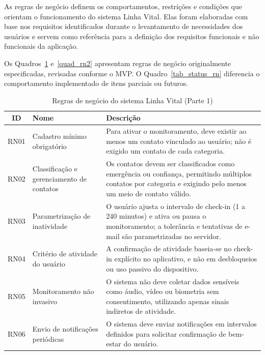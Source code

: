 As regras de negócio definem os comportamentos, restrições e condições que orientam o funcionamento do sistema Linha Vital. Elas foram elaboradas com base nos requisitos identificados durante o levantamento de necessidades dos usuários e servem como referência para a definição dos requisitos funcionais e não funcionais da aplicação.

Os Quadros~\ref{quad_rn1} e~\ref{quad_rn2} apresentam regras de negócio originalmente especificadas, revisadas conforme o MVP. O Quadro~\ref{tab_status_rn} diferencia o comportamento implementado de itens parciais ou futuros.

\begin{table}[H]
\caption{Regras de negócio do sistema Linha Vital (Parte 1)}
\label{quad_rn1}
\centering

\begin{tabular}{|c|p{4cm}|p{8cm}|}
\hline
\textbf{ID} & \textbf{Nome} & \textbf{Descrição} \\
\hline

RN01 & Cadastro mínimo obrigatório &
Para ativar o monitoramento, deve existir ao menos um contato vinculado ao usuário; não é exigido um contato de cada categoria. \\
\hline

RN02 & Classificação e gerenciamento de contatos &
Os contatos devem ser classificados como emergência ou confiança, permitindo múltiplos contatos por categoria e exigindo pelo menos um meio de contato válido. \\
\hline

RN03 & Parametrização de inatividade &
O usuário ajusta o intervalo de check-in (1 a 240 minutos) e ativa ou pausa o monitoramento; a tolerância e tentativas de e-mail são parametrizadas no servidor. \\
\hline

RN04 & Critério de atividade do usuário &
A confirmação de atividade baseia-se no check-in explícito no aplicativo, e não em desbloqueios ou uso passivo do dispositivo. \\
\hline

RN05 & Monitoramento não invasivo &
O sistema não deve coletar dados sensíveis como áudio, vídeo ou biometria sem consentimento, utilizando apenas sinais indiretos de atividade. \\
\hline

RN06 & Envio de notificações periódicas &
O sistema deve enviar notificações em intervalos definidos para solicitar confirmação de bem-estar do usuário. \\
\hline


\end{tabular}
\end{table}
